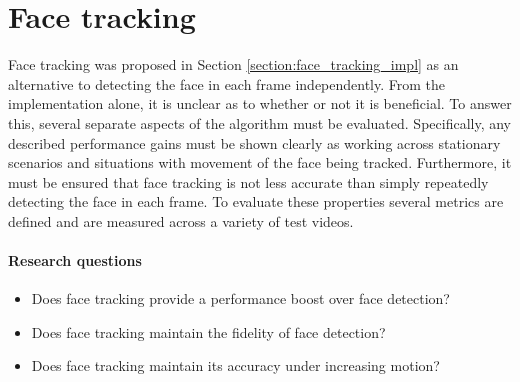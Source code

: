 \section{Face tracking}
\label{section:face_tracking}
Face tracking was proposed in Section \ref{section:face_tracking_impl} as an alternative to detecting the face in each frame independently.
From the implementation alone, it is unclear as to whether or not it is beneficial. To answer this, several separate aspects of the algorithm must be evaluated. 
Specifically, any described performance gains must be shown clearly as working across stationary scenarios and situations with movement of the face being tracked. Furthermore, it must be ensured that face tracking is not less accurate than simply repeatedly detecting the face in each frame. To evaluate these properties several metrics are defined and are measured across a variety of test videos.
\paragraph{Research questions}
\begin{itemize}
    \item Does face tracking provide a performance boost over face detection?
    \item Does face tracking maintain the fidelity of face detection?
    \item Does face tracking maintain its accuracy under increasing motion?
\end{itemize}

